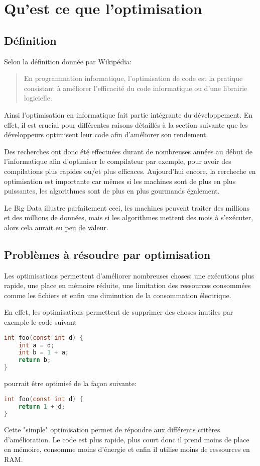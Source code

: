 \section{Qu'est ce que l'optimisation}
\subsection{Définition}
Selon la définition donnée par Wikipédia:
\begin{quote}
    En programmation informatique, l'optimisation de code est la pratique consistant à améliorer l'efficacité du code informatique ou d'une librairie logicielle. \cite{wiki:Optimisation_de_code}
\end{quote}
Ainsi l'optimisation en informatique fait partie intégrante du développement. En effet, il est crucial pour différentes raisons détaillés à la section suivante que les développeurs optimisent leur code afin d'améliorer son rendement.

Des recherches ont donc été effectuées durant de nombreuses années au début de l'informatique afin d'optimiser le compilateur par exemple, pour avoir des compilations plus rapides ou/et plus efficaces. Aujourd'hui encore, la rercheche en optimisation est importante car mêmes si les machines sont de plus en plus puissantes, les algorithmes sont de plus en plus gourmands également.

Le Big Data illustre parfaitement ceci, les machines peuvent traiter des millions et des millions de données, mais si les algorithmes mettent des mois à s'exécuter, alors cela aurait eu peu de valeur.

\subsection{Problèmes à résoudre par optimisation}
Les optimisations permettent d'améliorer nombreuses choses: une exécutions plus rapide, une place en mémoire réduite, une limitation des ressources consommées comme les fichiers et enfin une diminution de la consommation électrique.

En effet, les optimisations permettent de supprimer des choses inutiles par exemple le code suivant
\begin{center}
\begin{lstlisting}[language=c, xleftmargin=.35\textwidth]
int foo(const int d) {
    int a = d;
    int b = 1 + a;
    return b;
}
\end{lstlisting}
\end{center}
pourrait être optimisé de la façon suivante:
\begin{lstlisting}[language=c, xleftmargin=.35\textwidth]
int foo(const int d) {
    return 1 + d;
}
\end{lstlisting}
Cette "simple" optimisation permet de répondre aux différents critères d'amélioration. Le code est plus rapide, plus court donc il prend moins de place en mémoire, consomme moins d'énergie et enfin il utilise moins de ressources en RAM.

